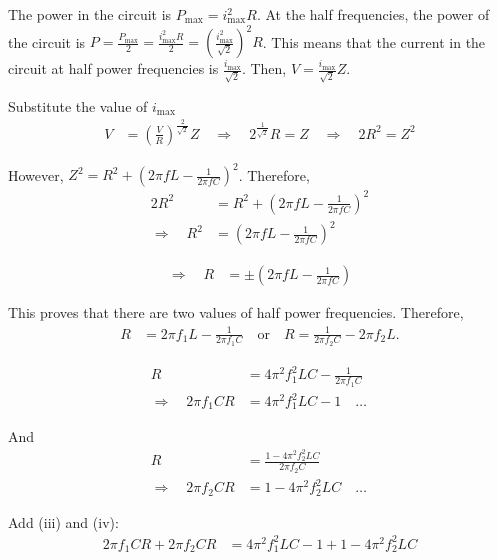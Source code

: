 \documentclass[journal,12pt,twocolumn]{IEEEtran}
\theoremstyle{remark}
\begin{document}
The power in the circuit is $P_{\text{max}} = i_{\text{max}}^2 R$. At the half frequencies, the power of the circuit is $P = \frac{P_{\text{max}}}{2} = \frac{i_{\text{max}}^2 R}{2} = \left(\frac{i_{\text{max}}^2}{\sqrt{2}}\right)^2 R$. This means that the current in the circuit at half power frequencies is $\frac{i_{\text{max}}}{\sqrt{2}}$. Then, $V = \frac{i_{\text{max}}}{\sqrt{2}} Z$.

Substitute the value of $i_{\text{max}}$ 
\begin{align}
    V &= \left(\frac{V}{R}\right)^{\frac{2}{\sqrt{2}}} Z \quad \Rightarrow \quad 2^{\frac{1}{\sqrt{2}}} R = Z \quad \Rightarrow \quad 2R^2 = Z^2
\end{align}

However, $Z^2 = R^2 + \left(2\pi f L - \frac{1}{2\pi f C}\right)^2$. Therefore,
\begin{align}
    2R^2 &= R^2 + \left(2\pi f L - \frac{1}{2\pi f C}\right)^2 \\
    \Rightarrow \quad R^2 &= \left(2\pi f L - \frac{1}{2\pi f C}\right)^2
\end{align}

\begin{align}
    \Rightarrow \quad R &= \pm \left(2\pi f L - \frac{1}{2\pi f C}\right)
\end{align}

This proves that there are two values of half power frequencies. Therefore,
\begin{align}
    R &= 2\pi f_1 L - \frac{1}{2\pi f_1 C} \quad \text{or} \quad R = \frac{1}{2\pi f_2 C} - 2\pi f_2 L.
\end{align}

\begin{align}
    R &= 4\pi^2 f_1^2 LC - \frac{1}{2\pi f_1 C} \\
    \Rightarrow \quad 2\pi f_1 C R &= 4\pi^2 f_1^2 LC - 1 \quad \ldots \,
\end{align}

And
\begin{align}
    R &= \frac{1 - 4\pi^2 f_2^2 LC}{2\pi f_2 C} \\
    \Rightarrow \quad 2\pi f_2 C R &= 1 - 4\pi^2 f_2^2 LC \quad \ldots \,
\end{align}

Add (iii) and (iv):
\begin{align}
    2\pi f_1 C R + 2\pi f_2 C R &= 4\pi^2 f_1^2 LC - 1 + 1 - 4\pi^2 f_2^2 LC
\end{align}
\end{document}
